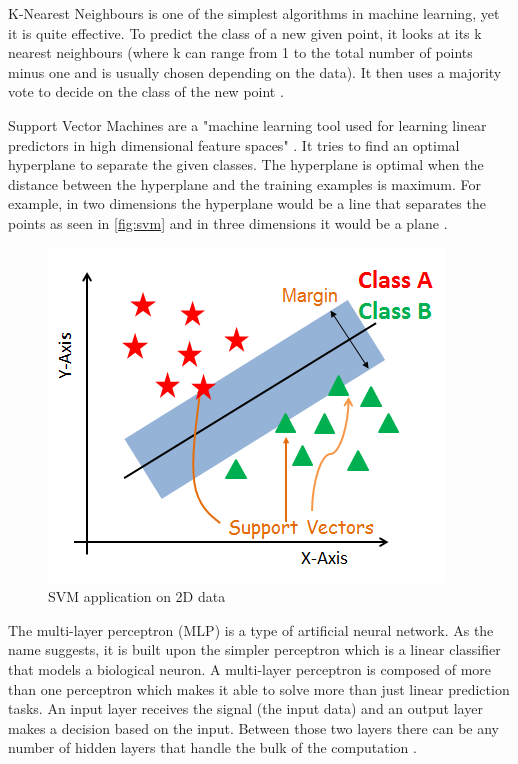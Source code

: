 

K-Nearest Neighbours is one of the simplest algorithms in machine learning, yet it is quite effective. To predict the class of a new given point, it looks at its k nearest neighbours (where k can range from 1 to the total number of points minus one and is usually chosen depending on the data). It then uses a majority vote to decide on the class of the new point \cite{16Neares99:online}.

Support Vector Machines are a "machine learning tool used for learning linear predictors in high dimensional feature spaces" \cite{shalev2014understanding}. It tries to find an optimal hyperplane to separate the given classes. The hyperplane is optimal when the distance between the hyperplane and the training examples is maximum. For example, in two dimensions the hyperplane would be a line that separates the points as seen in \autoref{fig:svm} and in three dimensions it would be a plane \cite{Introduc22:online}.

\begin{figure}[h]
\centering
\includegraphics[width=0.6\linewidth]{background/fig/svm.PNG}
\caption{SVM application on 2D data \cite{SVMGraph:online}}
\label{fig:svm}
\end{figure}

The multi-layer perceptron (MLP) is a type of artificial neural network. As the name suggests, it is built upon the simpler perceptron which is a linear classifier that models a biological neuron. A multi-layer perceptron is composed of more than one perceptron which makes it able to solve more than just linear prediction tasks. An input layer receives the signal (the input data) and an output layer makes a decision based on the input. Between those two layers there can be any number of hidden layers that handle the bulk of the computation \cite{ABeginne87:online}.

